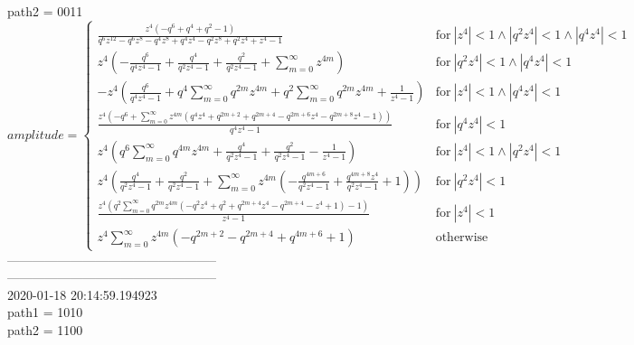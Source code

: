 \documentclass{jsreport}
\begin{document}
path2 = 0011\\
$$amplitude = \begin{cases} \frac{z^{4} \left(- q^{6} + q^{4} + q^{2} - 1\right)}{q^{6} z^{12} - q^{6} z^{8} - q^{4} z^{8} + q^{4} z^{4} - q^{2} z^{8} + q^{2} z^{4} + z^{4} - 1} & \text{for}\: \left|{z^{4}}\right| < 1 \wedge \left|{q^{2} z^{4}}\right| < 1 \wedge \left|{q^{4} z^{4}}\right| < 1 \\z^{4} \left(- \frac{q^{6}}{q^{4} z^{4} - 1} + \frac{q^{4}}{q^{2} z^{4} - 1} + \frac{q^{2}}{q^{2} z^{4} - 1} + \sum_{m=0}^{\infty} z^{4 m}\right) & \text{for}\: \left|{q^{2} z^{4}}\right| < 1 \wedge \left|{q^{4} z^{4}}\right| < 1 \\- z^{4} \left(\frac{q^{6}}{q^{4} z^{4} - 1} + q^{4} \sum_{m=0}^{\infty} q^{2 m} z^{4 m} + q^{2} \sum_{m=0}^{\infty} q^{2 m} z^{4 m} + \frac{1}{z^{4} - 1}\right) & \text{for}\: \left|{z^{4}}\right| < 1 \wedge \left|{q^{4} z^{4}}\right| < 1 \\\frac{z^{4} \left(- q^{6} + \sum_{m=0}^{\infty} z^{4 m} \left(q^{4} z^{4} + q^{2 m + 2} + q^{2 m + 4} - q^{2 m + 6} z^{4} - q^{2 m + 8} z^{4} - 1\right)\right)}{q^{4} z^{4} - 1} & \text{for}\: \left|{q^{4} z^{4}}\right| < 1 \\z^{4} \left(q^{6} \sum_{m=0}^{\infty} q^{4 m} z^{4 m} + \frac{q^{4}}{q^{2} z^{4} - 1} + \frac{q^{2}}{q^{2} z^{4} - 1} - \frac{1}{z^{4} - 1}\right) & \text{for}\: \left|{z^{4}}\right| < 1 \wedge \left|{q^{2} z^{4}}\right| < 1 \\z^{4} \left(\frac{q^{4}}{q^{2} z^{4} - 1} + \frac{q^{2}}{q^{2} z^{4} - 1} + \sum_{m=0}^{\infty} z^{4 m} \left(- \frac{q^{4 m + 6}}{q^{2} z^{4} - 1} + \frac{q^{4 m + 8} z^{4}}{q^{2} z^{4} - 1} + 1\right)\right) & \text{for}\: \left|{q^{2} z^{4}}\right| < 1 \\\frac{z^{4} \left(q^{2} \sum_{m=0}^{\infty} q^{2 m} z^{4 m} \left(- q^{2} z^{4} + q^{2} + q^{2 m + 4} z^{4} - q^{2 m + 4} - z^{4} + 1\right) - 1\right)}{z^{4} - 1} & \text{for}\: \left|{z^{4}}\right| < 1 \\z^{4} \sum_{m=0}^{\infty} z^{4 m} \left(- q^{2 m + 2} - q^{2 m + 4} + q^{4 m + 6} + 1\right) & \text{otherwise} \end{cases}$$
--------------------------------------------------\\
--------------------------------------------------\\
2020-01-18 20:14:59.194923\\
path1 = 1010\\
path2 = 1100\\
\end{document}

